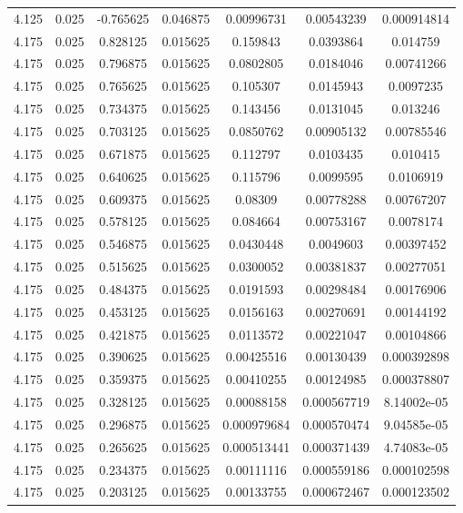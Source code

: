 \begin{flushleft}
\begin{longtable}{ccccccc}
4.125 & 0.025 & -0.765625 & 0.046875 & 0.00996731 & 0.00543239 & 0.000914814  \\ 
4.175 & 0.025 & 0.828125 & 0.015625 & 0.159843 & 0.0393864 & 0.014759  \\ 
4.175 & 0.025 & 0.796875 & 0.015625 & 0.0802805 & 0.0184046 & 0.00741266  \\ 
4.175 & 0.025 & 0.765625 & 0.015625 & 0.105307 & 0.0145943 & 0.0097235  \\ 
4.175 & 0.025 & 0.734375 & 0.015625 & 0.143456 & 0.0131045 & 0.013246  \\ 
4.175 & 0.025 & 0.703125 & 0.015625 & 0.0850762 & 0.00905132 & 0.00785546  \\ 
4.175 & 0.025 & 0.671875 & 0.015625 & 0.112797 & 0.0103435 & 0.010415  \\ 
4.175 & 0.025 & 0.640625 & 0.015625 & 0.115796 & 0.0099595 & 0.0106919  \\ 
4.175 & 0.025 & 0.609375 & 0.015625 & 0.08309 & 0.00778288 & 0.00767207  \\ 
4.175 & 0.025 & 0.578125 & 0.015625 & 0.084664 & 0.00753167 & 0.0078174  \\ 
4.175 & 0.025 & 0.546875 & 0.015625 & 0.0430448 & 0.0049603 & 0.00397452  \\ 
4.175 & 0.025 & 0.515625 & 0.015625 & 0.0300052 & 0.00381837 & 0.00277051  \\ 
4.175 & 0.025 & 0.484375 & 0.015625 & 0.0191593 & 0.00298484 & 0.00176906  \\ 
4.175 & 0.025 & 0.453125 & 0.015625 & 0.0156163 & 0.00270691 & 0.00144192  \\ 
4.175 & 0.025 & 0.421875 & 0.015625 & 0.0113572 & 0.00221047 & 0.00104866  \\ 
4.175 & 0.025 & 0.390625 & 0.015625 & 0.00425516 & 0.00130439 & 0.000392898  \\ 
4.175 & 0.025 & 0.359375 & 0.015625 & 0.00410255 & 0.00124985 & 0.000378807  \\ 
4.175 & 0.025 & 0.328125 & 0.015625 & 0.00088158 & 0.000567719 & 8.14002e-05  \\ 
4.175 & 0.025 & 0.296875 & 0.015625 & 0.000979684 & 0.000570474 & 9.04585e-05  \\ 
4.175 & 0.025 & 0.265625 & 0.015625 & 0.000513441 & 0.000371439 & 4.74083e-05  \\ 
4.175 & 0.025 & 0.234375 & 0.015625 & 0.00111116 & 0.000559186 & 0.000102598  \\ 
4.175 & 0.025 & 0.203125 & 0.015625 & 0.00133755 & 0.000672467 & 0.000123502  \\ 

\end{longtable}
\end{flushleft}
